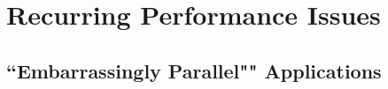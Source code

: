 ﻿\chapter{Recurring Performance Issues}

\section{``Embarrassingly Parallel"" Applications}
\label{embpar}